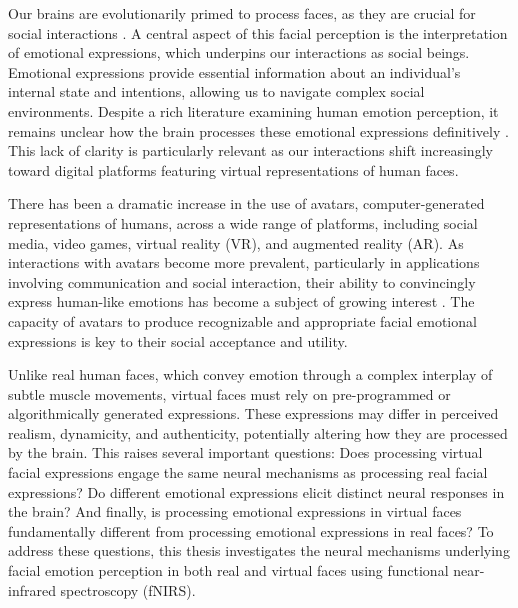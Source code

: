 Our brains are evolutionarily primed to process faces, as they are crucial for social interactions \citep{powell_social_2018}. 
A central aspect of this facial perception is the interpretation of emotional expressions, which underpins our interactions as social beings. 
Emotional expressions provide essential information about an individual's internal state and intentions, allowing us to navigate complex social environments.
Despite a rich literature examining human emotion perception, it remains unclear how the brain processes these emotional expressions definitively \citep{barrett_are_2006}. 
This lack of clarity is particularly relevant as our interactions shift increasingly toward digital platforms featuring virtual representations of human faces.

There has been a dramatic increase in the use of avatars, computer-generated representations of humans, across a wide range of platforms, including social media, video games, virtual reality (VR), and augmented reality (AR). 
As interactions with avatars become more prevalent, particularly in applications involving communication and social interaction, their ability to convincingly express human-like emotions has become a subject of growing interest \citep{kegel_dynamic_2020}. 
The capacity of avatars to produce recognizable and appropriate facial emotional expressions is key to their social acceptance and utility.

Unlike real human faces, which convey emotion through a complex interplay of subtle muscle movements, virtual faces must rely on pre-programmed or algorithmically generated expressions. 
These expressions may differ in perceived realism, dynamicity, and authenticity, potentially altering how they are processed by the brain. 
This raises several important questions: Does processing virtual facial expressions engage the same neural mechanisms as processing real facial expressions? 
Do different emotional expressions elicit distinct neural responses in the brain? 
And finally, is processing emotional expressions in virtual faces fundamentally different from processing emotional expressions in real faces?
To address these questions, this thesis investigates the neural mechanisms underlying facial emotion perception in both real and virtual faces using functional near-infrared spectroscopy (fNIRS).

